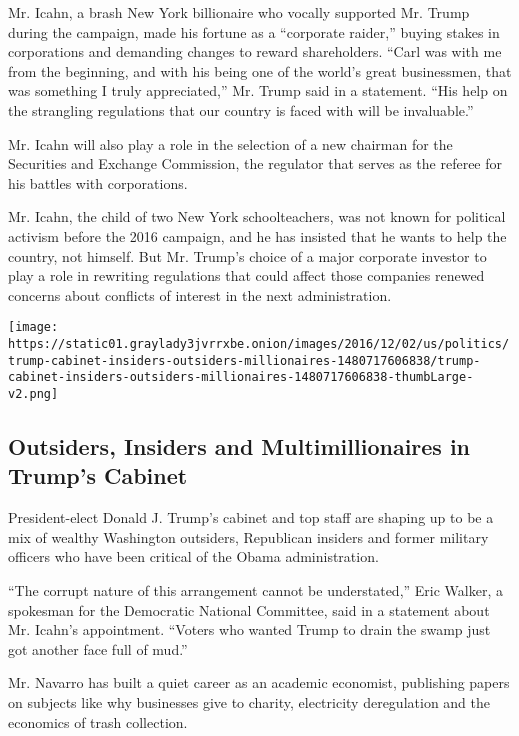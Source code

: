 Mr. Icahn, a brash New York billionaire who vocally supported Mr. Trump
during the campaign, made his fortune as a ``corporate raider,'' buying
stakes in corporations and demanding changes to reward shareholders.
``Carl was with me from the beginning, and with his being one of the
world's great businessmen, that was something I truly appreciated,'' Mr.
Trump said in a statement. ``His help on the strangling regulations that
our country is faced with will be invaluable.''

Mr. Icahn will also play a role in the selection of a new chairman for
the Securities and Exchange Commission, the regulator that serves as the
referee for his battles with corporations.

Mr. Icahn, the child of two New York schoolteachers, was not known for
political activism before the 2016 campaign, and he has insisted that he
wants to help the country, not himself. But Mr. Trump's choice of a
major corporate investor to play a role in rewriting regulations that
could affect those companies renewed concerns about conflicts of
interest in the next administration.

\href{https://www.nytimes3xbfgragh.onion/interactive/2016/12/05/us/politics/trump-cabinet-insiders-outsiders-millionaires.html}{}

\texttt{[image: https://static01.graylady3jvrrxbe.onion/images/2016/12/02/us/politics/trump-cabinet-insiders-outsiders-millionaires-1480717606838/trump-cabinet-insiders-outsiders-millionaires-1480717606838-thumbLarge-v2.png]}

\hypertarget{outsiders-insiders-and-multimillionaires-in-trumps-cabinet}{%
\subsection{Outsiders, Insiders and Multimillionaires in Trump's
Cabinet}\label{outsiders-insiders-and-multimillionaires-in-trumps-cabinet}}

President-elect Donald J. Trump's cabinet and top staff are shaping up
to be a mix of wealthy Washington outsiders, Republican insiders and
former military officers who have been critical of the Obama
administration.

``The corrupt nature of this arrangement cannot be understated,'' Eric
Walker, a spokesman for the Democratic National Committee, said in a
statement about Mr. Icahn's appointment. ``Voters who wanted Trump to
drain the swamp just got another face full of mud.''

Mr. Navarro has built a quiet career as an academic economist,
publishing papers on subjects like why businesses give to charity,
electricity deregulation and the economics of trash collection.

